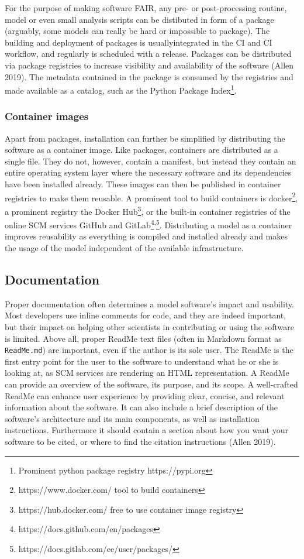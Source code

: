 \documentclass[preprint,11pt,5p]{elsarticle}
\begin{document}
For the purpose of making software FAIR, any pre- or post-processing
routine, model or even small analysis scripts can be distibuted in form
of a package (arguably, some models can really be hard or impossible to
package). The building and deployment of packages is usuallyintegrated
in the CI and CI workflow, and regularly is scheduled with a release.
Packages can be distributed via package registries to increase
visibility and availability of the software (Allen 2019). The metadata
contained in the package is consumed by the registries and made
available as a catalog, such as the Python Package Index\footnote{Prominent
  python package registry https://pypi.org}.

\subsubsection{Container images}\label{container-images}

Apart from packages, installation can further be simplified by
distributing the software as a container image. Like packages,
containers are distributed as a single file. They do not, however,
contain a manifest, but instead they contain an entire operating system
layer where the necessary software and its dependencies have been
installed already. These images can then be published in container
registries to make them reusable. A prominent tool to build containers
is docker\footnote{https://www.docker.com/ tool to build containers}, a
prominent registry the Docker Hub\footnote{https://hub.docker.com/ free
  to use container image registry}, or the built-in container registries
of the online SCM services GitHub and
GitLab\footnote{https://docs.github.com/en/packages}\textsuperscript{,}\footnote{https://docs.gitlab.com/ee/user/packages/}.
Distributing a model as a container improves reusability as everything
is compiled and installed already and makes the usage of the model
independent of the available infrastructure.

\subsection{Documentation}\label{documentation}

Proper documentation often determines a model software's impact and
usability. Most developers use inline comments for code, and they are
indeed important, but their impact on helping other scientists in
contributing or using the software is limited. Above all, proper ReadMe
text files (often in Markdown format as \texttt{ReadMe.md}) are
important, even if the author is its sole user. The ReadMe is the first
entry point for the user to the software to understand what he or she is
looking at, as SCM services are rendering an HTML representation. A
ReadMe can provide an overview of the software, its purpose, and its
scope. A well-crafted ReadMe can enhance user experience by providing
clear, concise, and relevant information about the software. It can also
include a brief description of the software's architecture and its main
components, as well as installation instructions. Furthermore it should
contain a section about how you want your software to be cited, or where
to find the citation instructions (Allen 2019).
\end{document}
